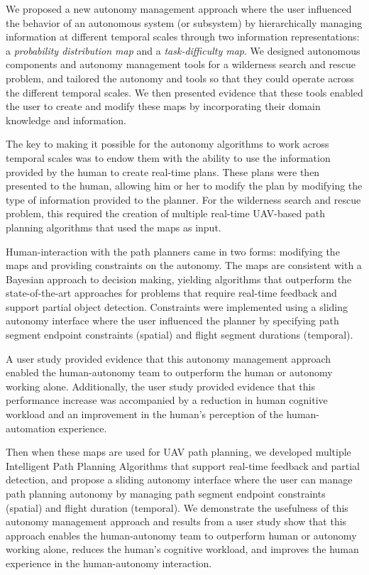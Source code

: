 We proposed a new autonomy management approach where the user influenced the behavior of an autonomous system (or subsystem) by hierarchically managing information at different temporal scales through two information representations:  a \textit{probability distribution map} and a \textit{task-difficulty map}. We designed autonomous components and autonomy management tools for a wilderness search and rescue problem, and tailored the autonomy and tools so that they could operate across the different temporal scales.  We then presented evidence that these tools enabled the user to create and modify these maps by incorporating their domain knowledge and information. 

The key to making it possible for the autonomy algorithms to work across temporal scales was to endow them with the ability to use the information provided by the human to create real-time plans.  These plans were then presented to the human, allowing him or her to modify the plan by modifying the type of information provided to the planner.  For the wilderness search and rescue problem, this required the creation of multiple real-time UAV-based path planning algorithms that used the maps as input.  

Human-interaction with the path planners came in two forms: modifying the maps and providing constraints on the autonomy. The maps are consistent with a Bayesian approach to decision making, yielding algorithms that outperform the state-of-the-art approaches for problems that require real-time feedback and support partial object detection.  Constraints were implemented using a sliding autonomy interface where the user influenced the planner by specifying path segment endpoint constraints (spatial) and flight segment durations (temporal).

A user study provided evidence that this autonomy management approach enabled the human-autonomy team to outperform the human or autonomy working alone.  Additionally, the user study provided evidence that this performance increase was accompanied by a reduction in human cognitive workload and an improvement in the human's perception of the human-automation experience.



Then when these maps are used for UAV path planning, we developed multiple Intelligent Path Planning Algorithms that support real-time feedback and partial detection, and propose a sliding autonomy interface where the user can manage path planning autonomy by managing path segment endpoint constraints (spatial) and flight duration (temporal). We demonstrate the usefulness of this autonomy management approach and results from a user study show that this approach enables the human-autonomy team to outperform human or autonomy working alone, reduces the human's cognitive workload, and improves the human experience in the human-autonomy interaction.

